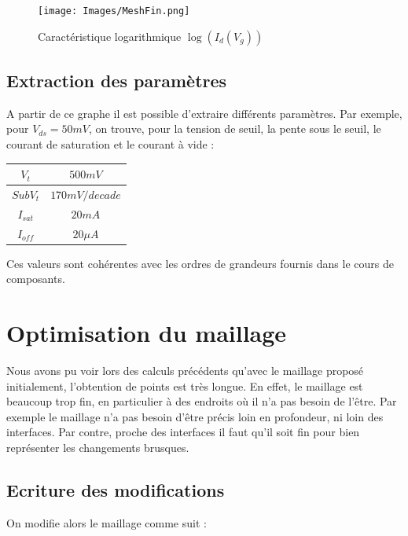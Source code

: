 \documentclass[a4paper,11pt]{report}
\begin{document}
\begin{figure}[H]
\centering
    \texttt{[image: Images/MeshFin.png]}
    \caption{Caractéristique logarithmique $\log(I_d(V_g))$}
    \label{logIdVgmeshfin}
\end{figure}

\section{Extraction des paramètres}
A partir de ce graphe il est possible d'extraire différents paramètres. Par exemple, pour $V_{ds}=50mV$, on trouve, pour la tension de seuil, la pente sous le seuil, le courant de saturation et le courant à vide :

\begin{tableau}[H]
\centering
\begin{tabular}{|c|c|}
\hline
$V_t$&$500mV$\\
\hline
$SubV_t$&$170mV/decade$\\
\hline
$I_{sat}$&$20mA$\\
\hline
$I_{off}$&$20\mu A$\\
\hline
\end{tabular}
\caption{Caractéristiques avec un maillage fin pour $V_{ds}=50mV$}

Ces valeurs sont cohérentes avec les ordres de grandeurs fournis dans le cours de composants.

\end{tableau}


\chapter{Optimisation du maillage}

Nous avons pu voir lors des calculs précédents qu'avec le maillage proposé initialement, l'obtention de points est très longue. En effet, le maillage est beaucoup trop fin, en particulier à des endroits où il n'a pas besoin de l'être. Par exemple le maillage n'a pas besoin d'être précis loin en profondeur, ni loin des interfaces. Par contre, proche des interfaces il faut qu'il soit fin pour bien représenter les changements brusques.
 
\section{Ecriture des modifications}
\vspace{0.3cm}

On modifie alors le maillage comme suit :
\vspace{0.3cm}
\end{document}
